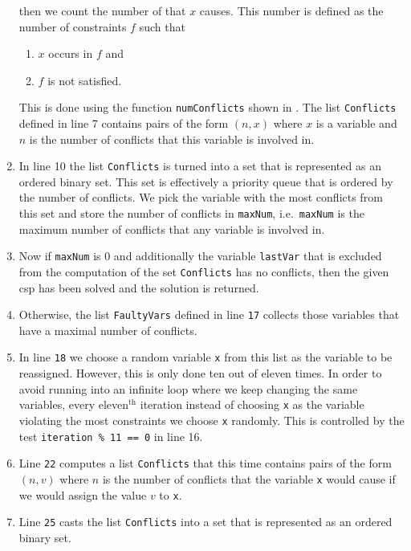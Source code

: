 \begin{enumerate}
      then we count the number of   that $x$ causes.  This number is defined 
      as the number of constraints $f$ such that
      \begin{enumerate}
      \item $x$ occurs in $f$ and
      \item $f$ is not satisfied.
      \end{enumerate}
      This is done using the function \texttt{numConflicts} shown in .
      The list \texttt{Conflicts} defined in line 7 contains pairs of the form $(n, x)$ where $x$ is a
      variable and $n$ is the number of conflicts that this variable is involved in.
\item In line 10 the list \texttt{Conflicts} is turned into a set that is represented as an ordered binary set.
      This set is effectively a 
      priority queue that is ordered by the number of conflicts.  We pick the variable with the most conflicts
      from this set and store the number of conflicts in \texttt{maxNum}, i.e.~\texttt{maxNum} is the maximum
      number of conflicts that any variable is involved in.
\item Now if \texttt{maxNum} is $0$ and additionally the variable \texttt{lastVar} that is excluded from the
      computation of the set \texttt{Conflicts} has no conflicts, then the given \ac{csp} has been solved and
      the solution is returned.
\item Otherwise, the list  \texttt{FaultyVars} defined in line \texttt{17} collects those variables that have a maximal
      number of conflicts.  
\item In line \texttt{18} we choose a random variable \texttt{x} from this list as the variable to be
      reassigned.  However, this is only done ten out of eleven times.  In order to avoid running into an
      infinite loop where we keep changing the same variables, every eleven$^\textrm{th}$ iteration instead of choosing \texttt{x}
      as the variable violating the most constraints we choose \texttt{x} randomly.  This is controlled by the
      test \texttt{iteration \% 11 == 0} in line 16.
\item Line \texttt{22} computes a list \texttt{Conflicts} that this time contains pairs of the form $(n, v)$ where $n$ 
      is the number of conflicts that the variable \texttt{x} would cause if we would assign the value $v$ to
      \texttt{x}.
\item Line \texttt{25} casts the list \texttt{Conflicts} into a set that is represented as an ordered binary set.

\end{enumerate}

